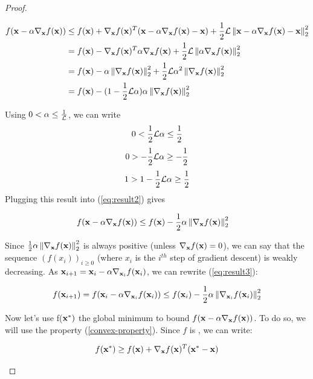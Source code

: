 \begin{proof}
    \begin{ceqn}
        \begin{align}
            f(\vx - \alpha \nabla_\vx f(\vx)) &\leq f(\vx) + \nabla_\vx f(\vx)^T(\vx - \alpha \nabla_\vx f(\vx)-\vx) + \frac{1}{2} \Lip \norm{\vx - \alpha \nabla_\vx f(\vx)-\vx}_2^2 \notag \\
            &= f(\vx) - \nabla_\vx f(\vx)^T \alpha \nabla_\vx f(\vx) + \frac{1}{2} \Lip \norm{\alpha \nabla_\vx f(\vx)}_2^2 \notag \\
            &= f(\vx) - \alpha \norm{\nabla_\vx f(\vx)}_2^2 + \frac{1}{2} \Lip \alpha^2 \norm{\nabla_\vx f(\vx)}_2^2\notag \\
            &= f(\vx) - (1 - \frac{1}{2} \Lip \alpha) \alpha \norm{\nabla_\vx f(\vx)}_2^2 \label{eq:result2}
        \end{align}
    \end{ceqn}
    Using $0 < \alpha \leq \frac{1}{\Lip}$, we can write
    $$0 < \frac{1}{2}\Lip\alpha \leq \frac{1}{2}$$
    $$0 > -\frac{1}{2}\Lip\alpha \geq -\frac{1}{2}$$
    $$1 > 1 -\frac{1}{2}\Lip\alpha \geq \frac{1}{2}$$
    Plugging this result into (\ref{eq:result2}) gives
    \begin{ceqn}
        \begin{align}
            &f(\vx - \alpha \nabla_\vx f(\vx)) \leq f(\vx) - \frac{1}{2}\alpha \norm{\nabla_\vx f(\vx)}_2^2 \label{eq:result3}
        \end{align}
    \end{ceqn}
    Since $\frac{1}{2}\alpha \norm{\nabla_\vx f(\vx)}_2^2$ is always positive (unless $\nabla_\vx f(\vx) = 0$), we can say that the sequence $(f(x_i))_{i \geq 0}$ (where $x_i$ is the $i^{th}$ step of gradient descent) is weakly decreasing. As $\vx_{i+1} = \vx_i - \alpha \nabla_{\vx_i} f(\vx_i)$, we can rewrite (\ref{eq:result3}): 
    \begin{ceqn}
        \begin{align}
            f(\vx_{i+1}) = f(\vx_i - \alpha \nabla_{\vx_i} f(\vx_i)) \leq f(\vx_i) - \frac{1}{2}\alpha \norm{\nabla_{\vx_i} f(\vx_i)}_2^2 \label{eq:result4}
        \end{align}
    \end{ceqn}
    Now let's use f($\vx^*)$ the global minimum to bound $f(\vx - \alpha \nabla_\vx f(\vx))$. To do so, we will use the property (\ref{convex-property}). Since $f$ is \cvx, we can write:
    \begin{ceqn}
        \begin{align*}
            f(\vx^*) &\geq f(\vx) + \nabla_\vx f(\vx)^T(\vx^* - \vx) \\

\end{align*}
\end{ceqn}
\end{proof}
